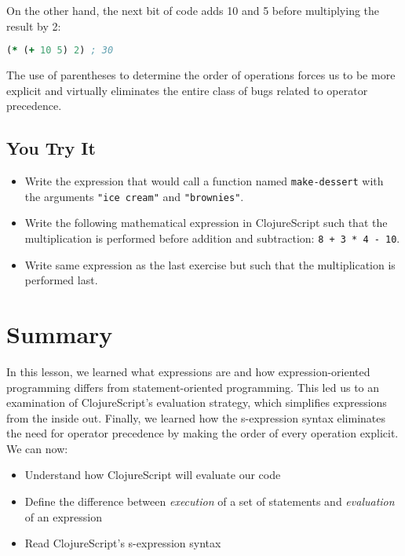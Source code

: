 \documentclass[10pt,twoside,openright]{memoir}
\begin{document}
On the other hand, the next bit of code adds 10 and 5 before multiplying
the result by 2:

\begin{lstlisting}[language=Clojure, caption={Add then multiply}]
(* (+ 10 5) 2) ; 30
\end{lstlisting}

The use of parentheses to determine the order of operations forces us to
be more explicit and virtually eliminates the entire class of bugs
related to operator precedence.

\subsection{You Try It}

\begin{itemize}
\tightlist
\item
  Write the expression that would call a function named
  \texttt{make-dessert} with the arguments \texttt{"ice\ cream"} and
  \texttt{"brownies"}.
\item
  Write the following mathematical expression in ClojureScript such that
  the multiplication is performed before addition and subtraction:
  \texttt{8\ +\ 3\ *\ 4\ -\ 10}.
\item
  Write same expression as the last exercise but such that the
  multiplication is performed last.
\end{itemize}

\section{Summary}

In this lesson, we learned what expressions are and how
expression-oriented programming differs from statement-oriented
programming. This led us to an examination of ClojureScript's evaluation
strategy, which simplifies expressions from the inside out. Finally, we
learned how the s-expression syntax eliminates the need for operator
precedence by making the order of every operation explicit. We can now:

\begin{itemize}
\tightlist
\item
  Understand how ClojureScript will evaluate our code
\item
  Define the difference between \emph{execution} of a set of statements
  and \emph{evaluation} of an expression
\item
  Read ClojureScript's s-expression syntax
\end{itemize}
\end{document}
